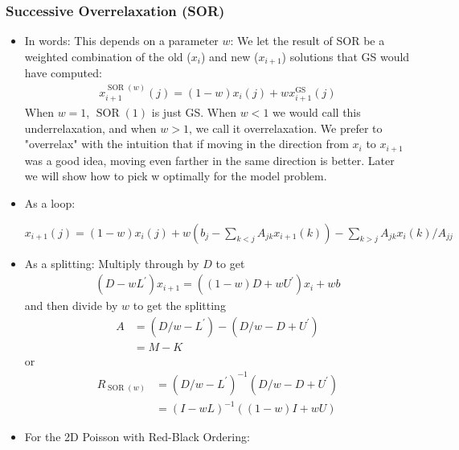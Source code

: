 \documentclass[11pt]{article}
\numberwithin{equation}{section}
\begin{document}
\subsubsection{Successive Overrelaxation (SOR)}
\begin{itemize}
    \item In words: This depends on a parameter $w$: We let the result of SOR be a weighted combination of the old ($x_i$) and new ($x_{i+1}$) solutions that GS would have computed: \begin{align*}
        x^{\operatorname{SOR}(w)}_{i+1}(j) = (1-w) x_i(j) + wx^{\operatorname{GS}}_{i+1}(j)    
    \end{align*}
    When $w=1$, $\operatorname{SOR}(1)$ is just GS. When $w<1$ we would call this underrelaxation, and when $w>1$, we call it overrelaxation. 
    We prefer to "overrelax" with the intuition that if moving in the direction from $x_i$ to $x_{i+1}$ was a good idea, moving even farther in the same direction is better.
    Later we will show how to pick w optimally for the model problem.
    \item As a loop:
    \begin{algorithmfrm}
        \begin{algorithmic}[1]
            \State $x_{i+1}(j)=(1-w)x_i(j) + w \left( b_j - \sum_{k < j} A_{jk}x_{i+1}(k) \right) - \sum_{k > j} A_{jk}x_i(k) / A_{jj}$ 
            \EndFor
        \end{algorithmic}
    \end{algorithmfrm}
    \item As a splitting: Multiply through by $D$ to get \begin{align*}
        (D-wL^\prime) x_{i+1} = \left( (1-w)D + wU^\prime \right)x_i + wb
    \end{align*}
    and then divide by $w$ to get the splitting \begin{align*}
        A &= (D/w - L^\prime) - (D/w- D + U^\prime) \\
        &= M - K
    \end{align*}
    or
    \begin{align*}
        R_{\operatorname{SOR}(w)} &= (D/w-L^\prime)^{-1} (D/w - D + U^\prime) \\
        &= (I-w L)^{-1} \left( (1-w)I +wU \right)
    \end{align*}
    \item For the 2D Poisson with Red-Black Ordering:
    \begin{algorithmfrm}

\end{algorithmfrm}
\end{itemize}
\end{document}
